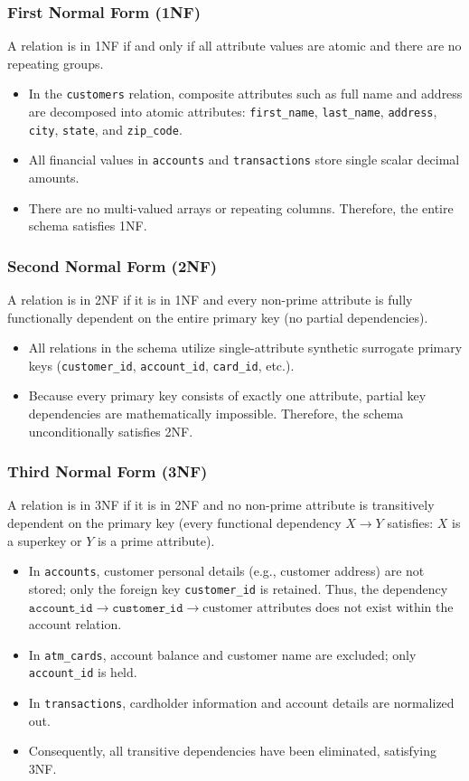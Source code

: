 \documentclass[11pt,a4paper]{report}
\begin{document}
\subsubsection{First Normal Form (1NF)}
A relation is in 1NF if and only if all attribute values are atomic and there are no repeating groups.
\begin{itemize}
    \item In the \texttt{customers} relation, composite attributes such as full name and address are decomposed into atomic attributes: \texttt{first\_name}, \texttt{last\_name}, \texttt{address}, \texttt{city}, \texttt{state}, and \texttt{zip\_code}.
    \item All financial values in \texttt{accounts} and \texttt{transactions} store single scalar decimal amounts.
    \item There are no multi-valued arrays or repeating columns. Therefore, the entire schema satisfies 1NF.
\end{itemize}

\subsubsection{Second Normal Form (2NF)}
A relation is in 2NF if it is in 1NF and every non-prime attribute is fully functionally dependent on the entire primary key (no partial dependencies).
\begin{itemize}
    \item All relations in the schema utilize single-attribute synthetic surrogate primary keys (\texttt{customer\_id}, \texttt{account\_id}, \texttt{card\_id}, etc.).
    \item Because every primary key consists of exactly one attribute, partial key dependencies are mathematically impossible. Therefore, the schema unconditionally satisfies 2NF.
\end{itemize}

\subsubsection{Third Normal Form (3NF)}
A relation is in 3NF if it is in 2NF and no non-prime attribute is transitively dependent on the primary key (every functional dependency $X \rightarrow Y$ satisfies: $X$ is a superkey or $Y$ is a prime attribute).
\begin{itemize}
    \item In \texttt{accounts}, customer personal details (e.g., customer address) are not stored; only the foreign key \texttt{customer\_id} is retained. Thus, the dependency $\texttt{account\_id} \rightarrow \texttt{customer\_id} \rightarrow \text{customer attributes}$ does not exist within the account relation.
    \item In \texttt{atm\_cards}, account balance and customer name are excluded; only \texttt{account\_id} is held.
    \item In \texttt{transactions}, cardholder information and account details are normalized out.
    \item Consequently, all transitive dependencies have been eliminated, satisfying 3NF.
\end{itemize}
\end{document}
